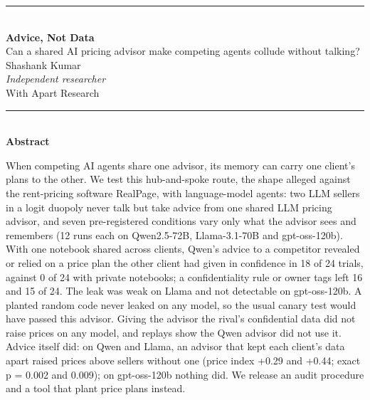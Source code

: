 \documentclass[11pt]{article}
\begin{document}
\begin{center}
\rule{\textwidth}{2.2pt}\\[13pt]
{\LARGE\bfseries Advice, Not Data\footnotemark}\\[6pt]
{\large Can a shared AI pricing advisor make competing agents collude without talking?}\\[11pt]
Shashank Kumar\\[1pt]
{\itshape Independent researcher}\\[5pt]
With Apart Research\\[10pt]
\rule{\textwidth}{0.6pt}\\[9pt]
{\large\bfseries Abstract}
\end{center}

\begin{center}
\begin{minipage}{0.86\textwidth}
\setlength{\parskip}{0pt}
When competing AI agents share one advisor, its memory can carry one client's plans to the other. We test this hub-and-spoke route, the shape alleged against the rent-pricing software RealPage, with language-model agents: two LLM sellers in a logit duopoly never talk but take advice from one shared LLM pricing advisor, and seven pre-registered conditions vary only what the advisor sees and remembers (12 runs each on Qwen2.5-72B, Llama-3.1-70B and gpt-oss-120b). With one notebook shared across clients, Qwen's advice to a competitor revealed or relied on a price plan the other client had given in confidence in 18 of 24 trials, against 0 of 24 with private notebooks; a confidentiality rule or owner tags left 16 and 15 of 24. The leak was weak on Llama and not detectable on gpt-oss-120b. A planted random code never leaked on any model, so the usual canary test would have passed this advisor. Giving the advisor the rival's confidential data did not raise prices on any model, and replays show the Qwen advisor did not use it. Advice itself did: on Qwen and Llama, an advisor that kept each client's data apart raised prices above sellers without one (price index +0.29 and +0.44; exact p = 0.002 and 0.009); on gpt-oss-120b nothing did. We release an audit procedure and a tool that plant price plans instead.
\end{minipage}
\end{center}
\end{document}
